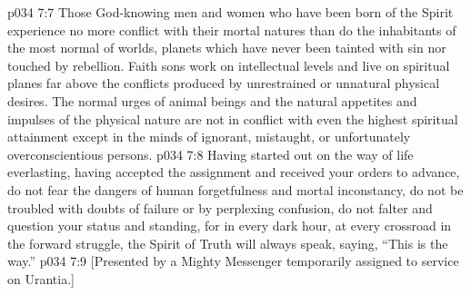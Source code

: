 \vs p034 7:7 Those God\hyp{}knowing men and women who have been born of the Spirit experience no more conflict with their mortal natures than do the inhabitants of the most normal of worlds, planets which have never been tainted with sin nor touched by rebellion. Faith sons work on intellectual levels and live on spiritual planes far above the conflicts produced by unrestrained or unnatural physical desires. The normal urges of animal beings and the natural appetites and impulses of the physical nature are not in conflict with even the highest spiritual attainment except in the minds of ignorant, mistaught, or unfortunately overconscientious persons.\plusone
\pc \vs p034 7:8 Having started out on the way of life everlasting, having accepted the assignment and received your orders to advance, do not fear the dangers of human forgetfulness and mortal inconstancy, do not be troubled with doubts of failure or by perplexing confusion, do not falter and question your status and standing, for in every dark hour, at every crossroad in the forward struggle, the Spirit of Truth will always speak, saying, “This is the way.”\plusone
\vsetoff
\vs p034 7:9 [Presented by a Mighty Messenger temporarily assigned to service on Urantia.]
